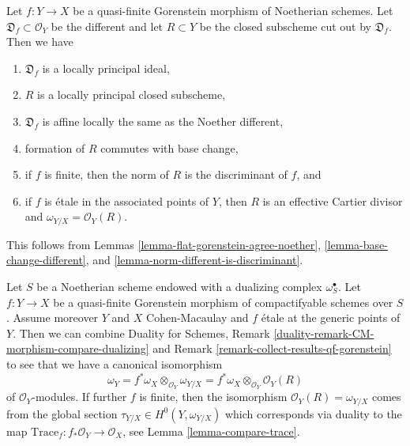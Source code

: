 \begin{remark}
\label{remark-collect-results-qf-gorenstein}
Let $f : Y \to X$ be a quasi-finite Gorenstein morphism of Noetherian schemes.
Let $\mathfrak D_f \subset \mathcal{O}_Y$ be the different and let
$R \subset Y$ be the closed subscheme cut out by $\mathfrak D_f$.
Then we have
\begin{enumerate}
\item $\mathfrak D_f$ is a locally principal ideal,
\item $R$ is a locally principal closed subscheme,
\item $\mathfrak D_f$ is affine locally the same as the Noether different,
\item formation of $R$ commutes with base change,
\item if $f$ is finite, then the norm of $R$ is the discriminant of $f$, and
\item if $f$ is \'etale in the associated points of $Y$, then
$R$ is an effective Cartier divisor and $\omega_{Y/X} = \mathcal{O}_Y(R)$.
\end{enumerate}
This follows from Lemmas \ref{lemma-flat-gorenstein-agree-noether},
\ref{lemma-base-change-different}, and
\ref{lemma-norm-different-is-discriminant}.
\end{remark}

\begin{remark}
\label{remark-collect-results-qf-gorenstein-two}
Let $S$ be a Noetherian scheme endowed with a dualizing complex
$\omega_S^\bullet$. Let $f : Y \to X$ be a quasi-finite Gorenstein
morphism of compactifyable schemes over $S$. Assume moreover
$Y$ and $X$ Cohen-Macaulay and $f$ \'etale at the generic
points of $Y$. Then we can combine
Duality for Schemes, Remark
\ref{duality-remark-CM-morphism-compare-dualizing} and
Remark \ref{remark-collect-results-qf-gorenstein}
to see that we have a canonical isomorphism
$$
\omega_Y = f^*\omega_X \otimes_{\mathcal{O}_Y} \omega_{Y/X} =
f^*\omega_X \otimes_{\mathcal{O}_Y} \mathcal{O}_Y(R)
$$
of $\mathcal{O}_Y$-modules. If further $f$ is finite,
then the isomorphism $\mathcal{O}_Y(R) = \omega_{Y/X}$ comes
from the global section $\tau_{Y/X} \in H^0(Y, \omega_{Y/X})$
which corresponds via duality to the map
$\text{Trace}_f : f_*\mathcal{O}_Y \to \mathcal{O}_X$, see
Lemma \ref{lemma-compare-trace}.
\end{remark}












